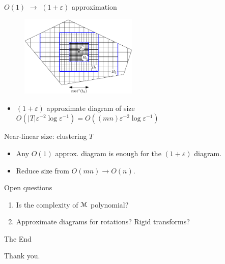 \documentclass[xcolor={dvipsnames,usenames}]{beamer}
\newcommand{\eps}{\varepsilon}
\def\abs#1{\mathopen| #1 \mathclose|}		%
\newcommand{\M}{\EuScript{M}}
\begin{document}
\begin{frame}{$O(1)$ $\rightarrow$ $(1+\eps)$ approximation}
\begin{figure}
\begin{center}
\includegraphics[width=0.5\textwidth,page=1]{nested-grid-crop}%
\end{center}
\end{figure}
\begin{itemize}
\item $(1+\eps)$ approximate diagram of size
	$O(\abs{T}\eps^{-2}\log\eps^{-1}) = O((mn)\eps^{-2}\log\eps^{-1})$
\end{itemize}
\end{frame}

\begin{frame}{Near-linear size: clustering $T$}
\begin{itemize}
\item Any $O(1)$ approx. diagram is enough for the $(1+\eps)$ diagram.
\item Reduce size from $O(mn) \rightarrow O(n)$.
\end{itemize}
\end{frame}

\begin{frame}{Open questions}
\begin{enumerate}
\item Is the complexity of $\M$ polynomial?
\item Approximate diagrams for rotations? Rigid transforms?
\end{enumerate}
\end{frame}

\begin{frame}{The End}
\begin{center}
	Thank you.
\end{center}
\end{frame}

%
%
\end{document}
